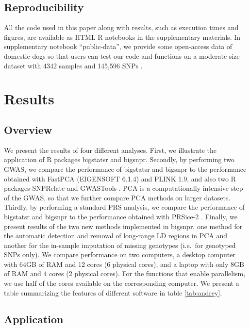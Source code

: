 \documentclass{bioinfo}
\begin{document}
\begin{methods}
\subsection{Reproducibility}

All the code used in this paper along with results, such as execution times and figures, are available as HTML R notebooks in the supplementary materials. 
{\color{red}
In supplementary notebook ``public-data'', we provide some open-access data of domestic dogs so that users can test our code and functions on a moderate size dataset with 4342 samples and 145,596 SNPs \cite[]{hayward2016complex}.
}

\end{methods}

\section{Results}

\subsection{Overview}\label{sec:overview}

We present the results of four different analyses. 
First, we illustrate the application of R packages bigstatsr and bigsnpr. 
Secondly, by performing two GWAS, we compare the performance of bigstatsr and bigsnpr to the performance obtained with FastPCA (EIGENSOFT 6.1.4) and PLINK 1.9, and also two R packages SNPRelate and GWASTools \cite[]{chang2015second,Galinsky2016,Gogarten2012,zheng2012high}. PCA is a computationally intensive step of the GWAS, so that we further compare PCA methods on larger datasets.
Thirdly, by performing a standard PRS analysis, we compare the performance of bigstatsr and bigsnpr to the performance obtained with PRSice-2 \cite[]{Euesden2015}. 
Finally, we present results of the two new methods implemented in bigsnpr, one method for the automatic detection and removal of long-range LD regions in PCA and another for the in-sample imputation of missing genotypes (i.e.\ for genotyped SNPs only). 
We compare performance on two computers, a desktop computer with 64GB of RAM and 12 cores (6 physical cores), and a laptop with only 8GB of RAM and 4 cores (2 physical cores). For the functions that enable parallelism, we use half of the cores available on the corresponding computer. We present a table summarizing the features of different software in table \ref{tab:andrey}.

\subsection{Application}
 
\end{document}
